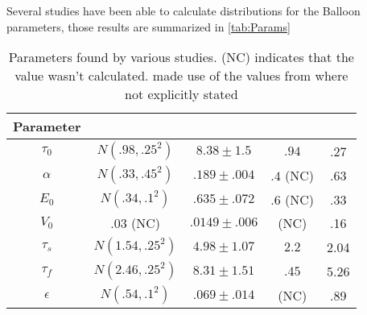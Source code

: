 Several studies have been able to calculate distributions for the 
Balloon parameters, those results are summarized in \autoref{tab:Params}


\begin{table}[t]
\centering
\begin{tabular}{|c || c | c | c | c|}
\hline 
Parameter  & \cite{Friston2000} & \cite{Johnston2008} & \cite{Vakorin2007} & \cite{Deneux2006}\\
\hline
$\tau_0  $ &  $N(.98 , .25^2)$  & $8.38 \pm 1.5  $ & $.94$ & .27\\
$\alpha  $ &  $N(.33 , .45^2)$  & $.189 \pm .004 $ & $.4$ (NC) & .63 \\
$E_0     $ &  $N(.34 , .1 ^2)$  & $.635 \pm .072 $ & $.6$ (NC) & .33\\
$V_0     $ &  $.03$ (NC)        & $.0149 \pm .006$ & (NC) & .16\\
$\tau_s  $ &  $N(1.54, .25^2)$  & $4.98 \pm 1.07 $ & $2.2$ & 2.04 \\
$\tau_f  $ &  $N(2.46, .25^2)$  & $8.31 \pm 1.51 $ & $.45$ & 5.26\\
$\epsilon$ &  $N(.54 , .1 ^2)$  & $.069 \pm .014 $ & (NC) & .89\\
\hline
\end{tabular}
\caption{Parameters found by various studies. (NC) indicates that the value
wasn't calculated. \cite{Vakorin2007} made use of the values from \cite{Friston2002}
where not explicitly stated}
\label{tab:Params} 
\end{table}

